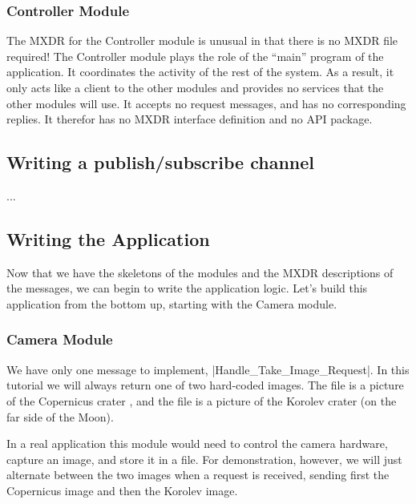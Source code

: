
\subsubsection{Controller Module}

The MXDR for the Controller module is unusual in that there is no MXDR file required! The
Controller module plays the role of the ``main'' program of the application. It coordinates the
activity of the rest of the system. As a result, it only acts like a client to the other modules
and provides no services that the other modules will use. It accepts no request messages, and
has no corresponding replies. It therefor has no MXDR interface definition and no API package.

\subsection{Writing a publish/subscribe channel}
\label{sec:manual-tutorial-pub-sub}

...

\subsection{Writing the Application}
\label{sec:manual-tutorial-writing}

Now that we have the skeletons of the modules and the MXDR descriptions of the messages, we can
begin to write the application logic. Let's build this application from the bottom up, starting
with the Camera module.

\subsubsection{Camera Module}

We have only one message to implement, |Handle_Take_Image_Request|. In this tutorial we will always
return one of two hard-coded images. The file  is a picture of
the Copernicus crater \cite{Copernicus}, and the file  is a picture
of the Korolev crater \cite{Korolev} (on the far side of the Moon).

In a real application this module would need to control the camera hardware, capture an image,
and store it in a file. For demonstration, however, we will just alternate between the two
images when a request is received, sending first the Copernicus image and then the Korolev
image.

